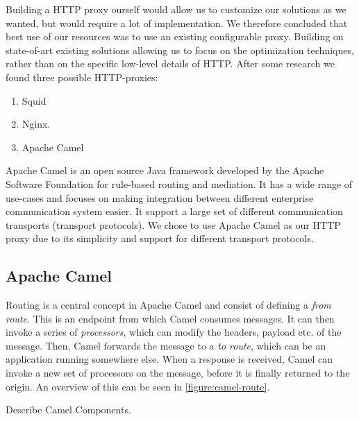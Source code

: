 Building a HTTP proxy ourself would allow us to customize our solutions as we
wanted, but would require a lot of implementation. We therefore concluded that
best use of our resources was to use an existing configurable proxy. Building
on state-of-art existing solutions allowing us to focus on the optimization
techniques, rather than on the specific low-level details of HTTP. After some research we found three possible HTTP-proxies:

\begin{enumerate}
    \item Squid
    \item Nginx.
    \item Apache Camel
\end{enumerate}

Apache Camel is an open source Java framework developed by the Apache Software
Foundation for rule-based routing and mediation\cite{camel-homepage}. It has a
wide range of use-cases and focuses on making integration between different
enterprise communication system easier. It support a large set of different
communication transports (transport protocols). We chose to use Apache Camel as
our HTTP proxy due to its simplicity and support for different transport
protocols.

\subsection{Apache Camel}

Routing is a central concept in Apache Camel and consist of defining a
\textit{from route}. This is an endpoint from which Camel consumes messages. It
can then invoke a series of \textit{processors}, which can modify the headers,
payload etc. of the message. Then, Camel forwards the message to a \textit{to
route}, which can be an application running somewhere else. When a response is
received, Camel can invoke a new set of processors on the message, before it is
finally returned to the origin. An overview of this can be seen in
\cref{figure:camel-route}.

Describe Camel Components.

